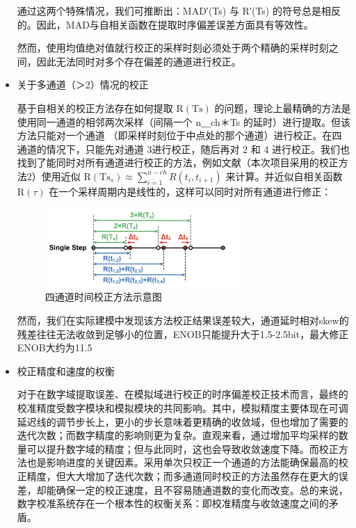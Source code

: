 \documentclass[cs4size,a4paper]{ctexart}
\numberwithin{equation}{section}
\numberwithin{table}{section}
\numberwithin{figure}{section}
\begin{document}
\begin{itemize}
			通过这两个特殊情况，我们可推断出：MAD′(Ts​) 与 R′(Ts​) 的符号总是相反的。因此，MAD与自相关函数在提取时序偏差误差方面具有等效性。
			
			然而，使用均值绝对值就行校正的采样时刻必须处于两个精确的采样时刻之间，因此无法同时对多个存在偏差的通道进行校正。
			
			\item 关于多通道（＞2）情况的校正
			
			基于自相关的校正方法存在如何提取 $\mathrm{R}(\mathrm{Ts})$ 的问题，理论上最精确的方法是使用同一通道的相邻两次采样（间隔一个 n＿ch＊Ts 的延时）进行提取。但该方法只能对一个通道 （即采样时刻位于中点处的那个通道）进行校正。在四通道的情况下，只能先对通道 3进行校正，随后再对 2 和 4 进行校正。我们也找到了能同时对所有通道进行校正的方法，例如文献\cite{ref3}（本次项目采用的校正方法2）使用近似 $\mathrm{R}\left(\mathrm{Ts}_s\right) \approx \sum_{i=1}^{n-c h} R\left(t_i, t_{i+1}\right)$ 来计算。并近似自相关函数 $\mathrm{R}(\tau)$ 在一个采样周期内是线性的，这样可以同时对所有通道进行修正：
			
			\begin{figure}[H]
				\centering
				\includegraphics[width=0.7\textwidth]{figure/feeling2.png}
				\caption{四通道时间校正方法示意图} 
				\label{fig:feeling2}
			\end{figure}
			
			然而，我们在实际建模中发现该方法校正结果误差较大，通道延时相对skew的残差往往无法收敛到足够小的位置，ENOB只能提升大于1.5-2.5bit，最大修正ENOB大约为11.5
			
			\item 校正精度和速度的权衡
			
			对于在数字域提取误差、在模拟域进行校正的时序偏差校正技术而言，最终的校准精度受数字模块和模拟模块的共同影响。其中，模拟精度主要体现在可调延迟线的调节步长上，更小的步长意味着更精确的收敛域，但也增加了需要的迭代次数；而数字精度的影响则更为复杂。直观来看，通过增加平均采样的数量可以提升数字域的精度；但与此同时，这也会导致收敛速度下降。而校正方法也是影响进度的关键因素。采用单次只校正一个通道的方法能确保最高的校正精度，但大大增加了迭代次数；而多通道同时校正的方法虽然存在更大的误差，却能确保一定的校正速度，且不容易随通道数的变化而改变。总的来说，数字校准系统存在一个根本性的权衡关系：即校准精度与收敛速度之间的矛盾。
			
		\end{itemize}
		
\end{document}
